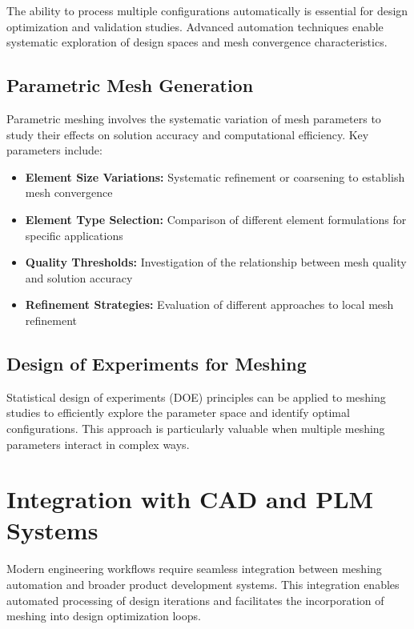 \documentclass{book}
\begin{document}
\begin{itemize}[leftmargin=*,label=\textbullet]
\begin{itemize}
The ability to process multiple configurations automatically is essential for design optimization and validation studies. Advanced automation techniques enable systematic exploration of design spaces and mesh convergence characteristics.

\subsection{Parametric Mesh Generation}

Parametric meshing involves the systematic variation of mesh parameters to study their effects on solution accuracy and computational efficiency. Key parameters include:

\begin{itemize}[leftmargin=*,label=\textbullet]
    \item \textbf{Element Size Variations:} Systematic refinement or coarsening to establish mesh convergence
    \item \textbf{Element Type Selection:} Comparison of different element formulations for specific applications
    \item \textbf{Quality Thresholds:} Investigation of the relationship between mesh quality and solution accuracy
    \item \textbf{Refinement Strategies:} Evaluation of different approaches to local mesh refinement
\end{itemize}

\subsection{Design of Experiments for Meshing}

Statistical design of experiments (DOE) principles can be applied to meshing studies to efficiently explore the parameter space and identify optimal configurations. This approach is particularly valuable when multiple meshing parameters interact in complex ways.

\section{Integration with CAD and PLM Systems}

Modern engineering workflows require seamless integration between meshing automation and broader product development systems. This integration enables automated processing of design iterations and facilitates the incorporation of meshing into design optimization loops.


\end{itemize}
\end{itemize}
\end{document}
